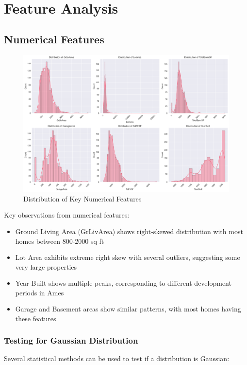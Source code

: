 \documentclass[12pt]{report}
\begin{document}
\section{Feature Analysis}
\subsection{Numerical Features}
\begin{figure}[H]
    \centering
    \includegraphics[width=1.0\textwidth]{figures/numerical_features_dist.png}
    \caption{Distribution of Key Numerical Features}
    \label{fig:num_features_dist}
\end{figure}

Key observations from numerical features:
\begin{itemize}
    \item Ground Living Area (GrLivArea) shows right-skewed distribution with most homes between 800-2000 sq ft
    \item Lot Area exhibits extreme right skew with several outliers, suggesting some very large properties
    \item Year Built shows multiple peaks, corresponding to different development periods in Ames
    \item Garage and Basement areas show similar patterns, with most homes having these features
\end{itemize}

\subsubsection{Testing for Gaussian Distribution}
Several statistical methods can be used to test if a distribution is Gaussian:
\end{document}
